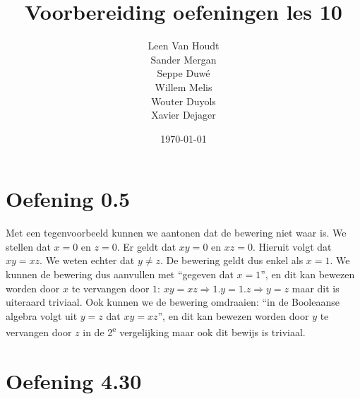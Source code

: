 \documentclass[12pt]{article}
\title{Voorbereiding oefeningen les 10}
\author{
        Leen Van Houdt \\
        Sander Mergan \\
        Seppe Duwé \\
        Willem Melis \\
        Wouter Duyols \\
        Xavier Dejager
}
\date{\today}
\begin{document}
\maketitle

\section{Oefening 0.5}

Met een tegenvoorbeeld kunnen we aantonen dat de bewering niet waar is. We stellen dat $x=0$ en $z=0$. Er geldt dat $xy=0$ en $xz=0$. Hieruit volgt dat $xy=xz$. We weten echter dat $y\neq z$. De bewering geldt dus enkel als $x=1$.
\vspace{2mm}
\newline
We kunnen de bewering dus aanvullen met ``gegeven dat $x=1$'', en dit kan bewezen worden door $x$ te vervangen door $1$: $xy = xz \Rightarrow 1.y = 1.z \Rightarrow y = z$ maar dit is uiteraard triviaal.
\vspace{2mm}
\newline
Ook kunnen we de bewering omdraaien: ``in de Booleaanse algebra volgt uit $y=z$ dat $xy=xz$'', en dit kan bewezen worden door $y$ te vervangen door $z$ in de 2\textsuperscript{e} vergelijking maar ook dit bewijs is triviaal.

\clearpage

\section{Oefening 4.30}
\end{document}

